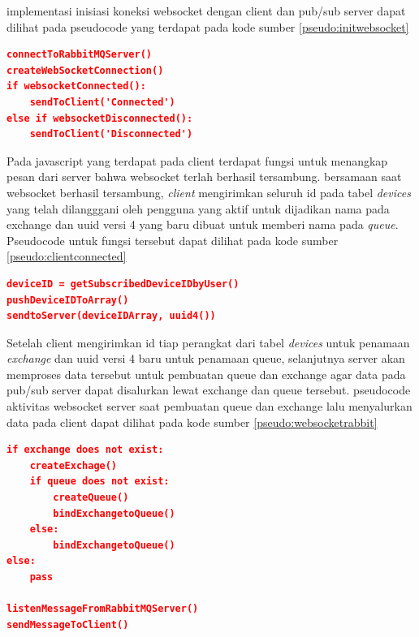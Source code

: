 		implementasi inisiasi koneksi websocket dengan client dan pub/sub server dapat dilihat pada pseudocode yang terdapat pada kode sumber \ref{pseudo:initwebsocket}
		
\begin{lstlisting}[frame=single,breaklines,caption={Pseudocode Inisiasi Komunikasi Websokcet dengan Client dan Pub/Sub Server}, label=pseudo:initwebsocket, captionpos=b, language=json]
connectToRabbitMQServer()
createWebSocketConnection()
if websocketConnected():
	sendToClient('Connected')
else if websocketDisconnected():
	sendToClient('Disconnected') 
\end{lstlisting}

		Pada javascript yang terdapat pada client terdapat fungsi untuk menangkap pesan dari server bahwa websocket terlah berhasil tersambung. bersamaan saat websocket berhasil tersambung, \textit{client} mengirimkan seluruh id pada tabel \textit{devices} yang telah dilangggani oleh pengguna yang aktif untuk dijadikan nama pada exchange dan uuid versi 4 yang baru dibuat untuk memberi nama pada \textit{queue}.
		Pseudocode untuk fungsi tersebut dapat dilihat pada kode sumber \ref{pseudo:clientconnected}
		
\begin{lstlisting}[frame=single,breaklines,caption={Pseudocode Aktivitas Client Saat Terkoneksi dengan Websocket},label=pseudo:clientconnected, captionpos=b, language=json]
deviceID = getSubscribedDeviceIDbyUser()
pushDeviceIDToArray()
sendtoServer(deviceIDArray, uuid4())
\end{lstlisting}

		Setelah client mengirimkan id tiap perangkat dari tabel \textit{devices} untuk penamaan \textit{exchange} dan uuid versi 4 baru untuk penamaan queue, selanjutnya server akan memproses data tersebut untuk pembuatan queue dan exchange agar data pada pub/sub server dapat disalurkan lewat exchange dan queue tersebut. pseudocode aktivitas websocket server saat pembuatan queue dan exchange lalu menyalurkan data pada client dapat dilihat pada kode sumber \ref{pseudo:websocketrabbit}
		
\begin{lstlisting}[frame=single,breaklines,caption={Pseudocode Aktivitas Websocket Saat Pembuatan Queue dan Exchange Untuk Penyaluran Data ke Client},label=pseudo:websocketrabbit, captionpos=b, language=json]
if exchange does not exist:
	createExchage()
	if queue does not exist:
		createQueue()
		bindExchangetoQueue()
	else:
		bindExchangetoQueue()
else:
	pass

listenMessageFromRabbitMQServer()
sendMessageToClient()
\end{lstlisting}
		
